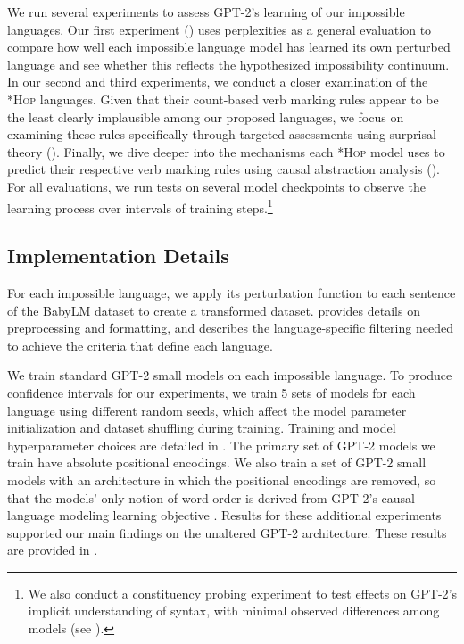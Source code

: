 \documentclass[11pt]{article}
\begin{document}
We run several experiments to assess GPT-2's learning of our impossible languages. Our first experiment () uses perplexities as a general evaluation to compare how well each impossible language model has learned its own perturbed language and see whether this reflects the hypothesized impossibility continuum. In our second and third experiments, we conduct a closer examination of the \textsc{*Hop} languages. Given that their count-based verb marking rules appear to be the least clearly implausible among our proposed languages, we focus on examining these rules specifically through targeted assessments using surprisal theory (). Finally, we dive deeper into the mechanisms each \textsc{*Hop} model uses to predict their respective verb marking rules using causal abstraction analysis (). For all evaluations, we run tests on several model checkpoints to observe the learning process over intervals of training steps.\footnote{
We also conduct a constituency probing experiment to test effects on GPT-2's implicit understanding of syntax, with minimal observed differences among models (see ).}

\subsection{Implementation Details}

For each impossible language, we apply its perturbation function to each sentence of the BabyLM dataset \cite{warstadt2023papers} to create a transformed dataset. 
 provides details on preprocessing and formatting, and describes the language-specific filtering needed to achieve the criteria that define each language.




We train standard GPT-2 small models \cite{radford2018improving, radford2019languagemodels} on each impossible language. To produce confidence intervals for our experiments, we train 5 sets of models for each language using different random seeds, which affect the model parameter initialization and dataset shuffling during training. Training and model hyperparameter choices are detailed in .
The primary set of GPT-2 models we train have absolute positional encodings. We also train a set of GPT-2 small models with an architecture in which the positional encodings are removed, so that the models' only notion of word order is derived from \mbox{GPT-2's} causal language modeling learning objective \cite{kazemnejad2023impact}. Results for these additional experiments supported our main findings on the unaltered GPT-2 architecture. These results are provided in .
\end{document}
